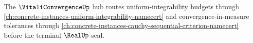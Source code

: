 The $\VitaliConvergenceUp$ hub routes uniform-integrability budgets through \autoref{ch:concrete-instances-uniform-integrability-namecert} and convergence-in-measure tolerances through \autoref{ch:concrete-instances-cauchy-sequential-criterion-namecert} before the terminal $\RealUp$ seal.





